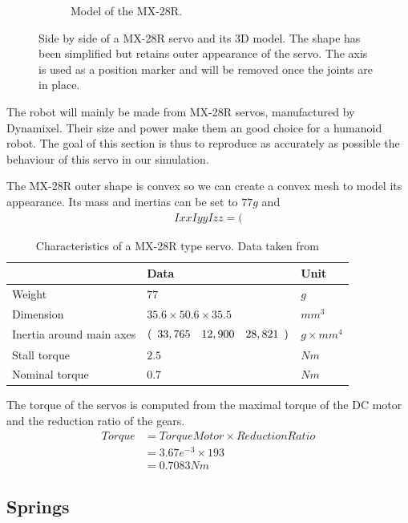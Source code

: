 \begin{figure}[htp]
\begin{subfigure}[b]{0.3\textwidth}
    \caption{Model of the MX-28R.}
    \label{fig:mx28_model}
\end{subfigure}
\caption{Side by side of a MX-28R servo and its 3D model. The shape has been simplified but retains outer appearance of the servo. The axis is used as a position marker and will be removed once the joints are in place.}
\label{fig:servo}
\end{figure}

The robot will mainly be made from MX-28R servos, manufactured by Dynamixel. Their size and power make them an good choice for a humanoid robot. The goal of this section is thus to reproduce as accurately as possible the behaviour of this servo in our simulation.

The MX-28R outer shape is convex so we can create a convex mesh to model its appearance. Its mass and inertias can be set to $77g$ and 
\begin{align*}
Ixx Iyy Izz = (
\end{align*}

\begin{table}[htp]
\center
\begin{tabularx}{\textwidth}{@{} l l l @{}}
\toprule
& \textbf{Data} & \textbf{Unit}\\ 
\midrule
Weight & $77$ & $g$\\
Dimension & $35.6 \times 50.6 \times 35.5$ & $mm^3$\\
Inertia around main axes & $(\begin{array}{c c c}
33,765 & 12,900 & 28,821
\end{array})$ & $g \times mm^4$ \\
Stall torque & $2.5$ & $Nm$\\
Nominal torque & $0.7$ & $Nm$\\
\bottomrule
\end{tabularx}
\caption{Characteristics of a MX-28R type servo. Data taken from \cite{mx_28_manual}}
\label{table:specs}
\end{table}

The torque of the servos is computed from the maximal torque of the DC motor and the reduction ratio of the gears. 
\begin{align*}
Torque &= TorqueMotor \times ReductionRatio\\
&= 3.67e^{-3} \times 193\\
&= 0.7083Nm
\end{align*} 

\subsection{Springs}

